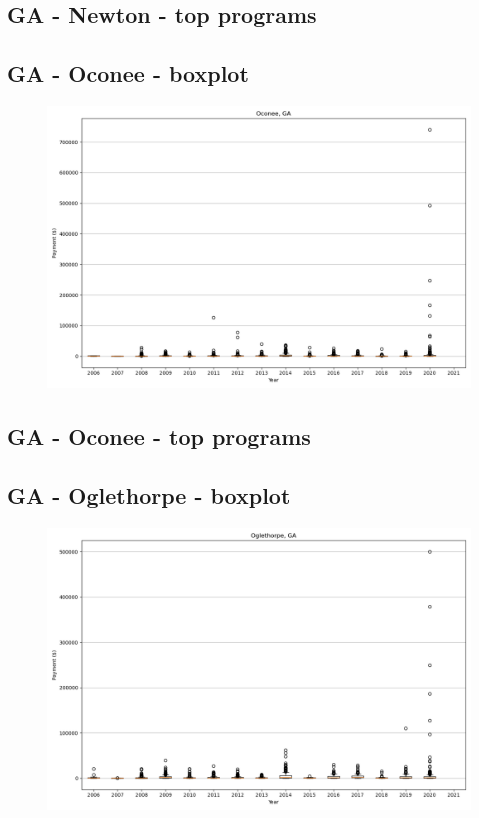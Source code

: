\subsection*{GA - Newton - top programs}

\newpage
\subsection*{GA - Oconee - boxplot}
\begin{figure}[h]
\centering
\includegraphics[width=7in]{../output/boxplots/counties/Oconee-GA_boxplot.png}
\end{figure}


\subsection*{GA - Oconee - top programs}

\newpage
\subsection*{GA - Oglethorpe - boxplot}
\begin{figure}[h]
\centering
\includegraphics[width=7in]{../output/boxplots/counties/Oglethorpe-GA_boxplot.png}
\end{figure}


